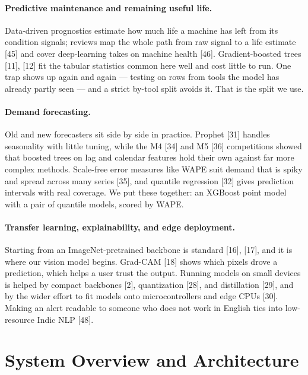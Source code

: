 \documentclass[12pt]{article}
\begin{document}
\paragraph{Predictive maintenance and remaining useful life.}
Data-driven prognostics estimate how much life a machine has left from its
condition signals; reviews map the whole path from raw signal to a life estimate
[45] and cover deep-learning takes on machine health [46]. Gradient-boosted trees
[11], [12] fit the tabular statistics common here well and cost little to run. One
trap shows up again and again --- testing on rows from tools the model has already
partly seen --- and a strict by-tool split avoids it. That is the split we use.

\paragraph{Demand forecasting.}
Old and new forecasters sit side by side in practice. Prophet [31] handles
seasonality with little tuning, while the M4 [34] and M5 [36] competitions showed
that boosted trees on lag and calendar features hold their own against far more
complex methods. Scale-free error measures like WAPE suit demand that is spiky and
spread across many series [35], and quantile regression [32] gives prediction
intervals with real coverage. We put these together: an XGBoost point model with a
pair of quantile models, scored by WAPE.

\paragraph{Transfer learning, explainability, and edge deployment.}
Starting from an ImageNet-pretrained backbone is standard [16], [17], and it is
where our vision model begins. Grad-CAM [18] shows which pixels drove a prediction,
which helps a user trust the output. Running models on small devices is helped by
compact backbones [2], quantization [28], and distillation [29], and by the wider
effort to fit models onto microcontrollers and edge CPUs [30]. Making an alert
readable to someone who does not work in English ties into low-resource Indic
NLP [48].

\section{System Overview and Architecture}
\label{sec:arch}
\end{document}
